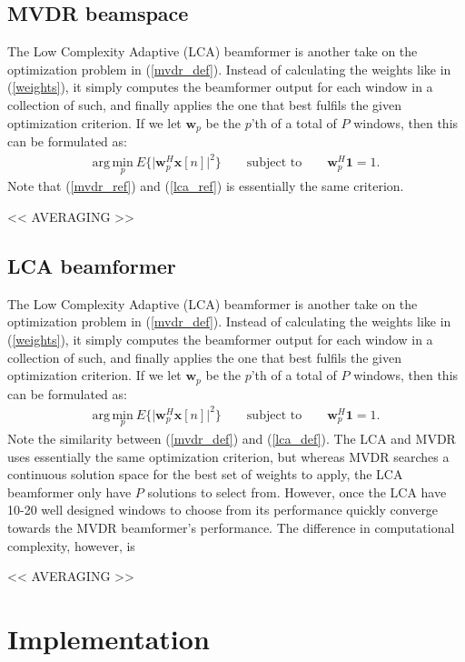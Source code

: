 \documentclass[
a4paper,10pt
]{ica2013_2}
\newcommand\argmin[1]{\text{arg}\,\underset{#1}{\text{min}}}
\newcommand\T{^{\scriptscriptstyle T}}
\renewcommand\H{^{\scriptscriptstyle H}}
\renewcommand\vec[1]{\boldsymbol{#1}}
\newcommand\mat[1]{\boldsymbol{#1}}
\newcommand\1{\vec 1}
\newcommand*\w{\vec w}
\newcommand*\x{\vec x}
\newcommand*\R{\mat R}
\newcommand*\Ri{\R^{-1}}
\begin{document}
\subsection{MVDR beamspace}

The Low Complexity Adaptive (LCA) beamformer is another take on the optimization problem in (\ref{mvdr_def}). Instead of calculating the weights like in (\ref{weights}), it simply computes the beamformer output for each window in a collection of such, and finally applies the one that best fulfils the given optimization criterion. If we let $\w_p$ be the $p$'th of a total of $P$ windows, then this can be formulated as:
\begin{gather}
\argmin{p}\ E\Big\{\big|\w_p\H\x[n]\big|^2\Big\} \qquad\text{subject to}\qquad \w_p\H\1 = 1\label{lca_def}. 
\end{gather}
Note that (\ref{mvdr_ref}) and (\ref{lca_ref}) is essentially the same criterion. 

<< AVERAGING >>

\subsection{LCA beamformer}

The Low Complexity Adaptive (LCA) beamformer is another take on the optimization problem in (\ref{mvdr_def}). Instead of calculating the weights like in (\ref{weights}), it simply computes the beamformer output for each window in a collection of such, and finally applies the one that best fulfils the given optimization criterion. If we let $\w_p$ be the $p$'th of a total of $P$ windows, then this can be formulated as:
\begin{gather}
\argmin{p}\ E\Big\{\big|\w_p\H\x[n]\big|^2\Big\} \qquad\text{subject to}\qquad \w_p\H\1 = 1. \label{lca_def}
\end{gather}
Note the similarity between (\ref{mvdr_def}) and (\ref{lca_def}). The LCA and MVDR uses essentially the same optimization criterion, but whereas MVDR searches a continuous solution space for the best set of weights to apply, the LCA beamformer only have $P$ solutions to select from. However, once the LCA have 10-20 well designed windows to choose from its performance quickly converge towards the MVDR beamformer's performance. The difference in computational complexity, however, is 

<< AVERAGING >>


\section{Implementation}\label{implementation}
\end{document}

